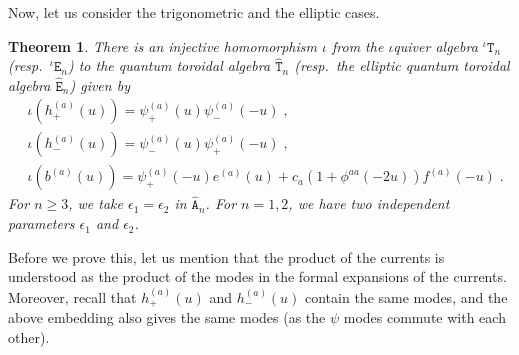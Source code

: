 \documentclass[11pt]{article}
\numberwithin{equation}{section}
\numberwithin{figure}{section}
\numberwithin{table}{section}
\newtheorem{theorem}{Theorem}[section]
\begin{document}
Now, let us consider the trigonometric and the elliptic cases.
\begin{theorem}\label{embeddingtrigell}
	There is an injective homomorphism $\iota$ from the $\iota$quiver algebra ${}^\iota\mathtt{T}_n$ (resp.~${}^\iota\mathtt{E}_n$) to the quantum toroidal algebra $\widehat{\mathtt{T}}_n$ (resp.~the elliptic quantum toroidal algebra $\widehat{\mathtt{E}}_n$) given by
	\begin{subequations}
		\begin{align}
			&\iota\left(h_+^{(a)}(u)\right)=\psi_+^{(a)}(u)\psi_-^{(a)}(-u)\;,\\
			&\iota\left(h_-^{(a)}(u)\right)=\psi_-^{(a)}(u)\psi_+^{(a)}(-u)\;,\\
			&\iota\left(b^{(a)}(u)\right)=\psi_+^{(a)}(-u)e^{(a)}(u)+c_a\left(1+\phi^{aa}(-2u)\right)f^{(a)}(-u)\;.
		\end{align}
	\end{subequations}
	For $n\geq3$, we take $\epsilon_1=\epsilon_2$ in $\widehat{\mathtt{A}}_n$. For $n=1,2$, we have two independent parameters $\epsilon_1$ and $\epsilon_2$.
\end{theorem}
Before we prove this, let us mention that the product of the currents is understood as the product of the modes in the formal expansions of the currents. Moreover, recall that $h_+^{(a)}(u)$ and $h_-^{(a)}(u)$ contain the same modes, and the above embedding also gives the same modes (as the $\psi$ modes commute with each other).
\end{document}
